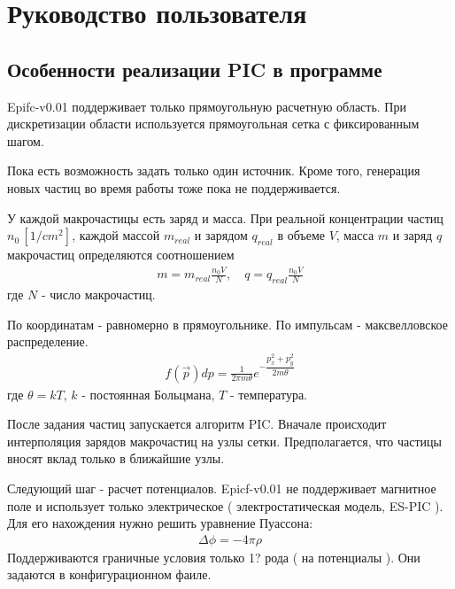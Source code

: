 \section{Руководство пользователя}

\subsection{ Особенности реализации PIC в программе \prognv }

Epifc-v0.01 поддерживает только прямоугольную расчетную область. 
При дискретизации области используется прямоугольная сетка с фиксированным шагом.


Пока есть возможность задать только один источник.
Кроме того, генерация новых частиц во время работы тоже пока не поддерживается.

У каждой макрочастицы есть заряд и масса. 
При реальной концентрации частиц $n_0\, [1/cm^2]$, каждой массой $m_{real}$ и зарядом $q_{real}$ в
объеме $V$, масса $m$ и заряд $q$ макрочастиц определяются соотношением
\begin{gather}
  m = m_{real} \frac{ n_0 V }{ N },
  \quad
  q = q_{real} \frac{ n_0 V }{ N }
\end{gather}
где $N$ - число макрочастиц.

По координатам - равномерно в прямоугольнике.
По импульсам - максвелловское распределение.
\begin{gather}
  f( \vec{p} ) dp = \frac{1}{ 2 \pi m \theta } e^{ - \dfrac{ p_x^2 + p_y^2 }{ 2 m \theta } }
\end{gather}
где $\theta = k T$, $k$ - постоянная Больцмана, $T$ - температура.



После задания частиц запускается алгоритм PIC. 
Вначале происходит интерполяция зарядов макрочастиц на узлы сетки.
Предполагается, что частицы вносят вклад только в ближайшие узлы. 


Следующий шаг - расчет потенциалов. 
Epicf-v0.01 не поддерживает магнитное поле
и использует только электрическое ( электростатическая модель, ES-PIC ).
Для его нахождения нужно решить уравнение Пуассона:
\begin{gather}
  \Delta \phi = - 4 \pi \rho
\end{gather}
Поддерживаются граничные условия только 1? рода ( на потенциалы ).
Они задаются в конфигурационном фаиле.

